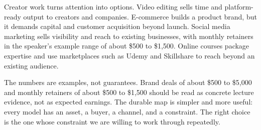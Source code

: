 Creator work turns attention into options. Video editing sells time and platform-ready output to creators and companies. E-commerce builds a product brand, but it demands capital and customer acquisition beyond launch. Social media marketing sells visibility and reach to existing businesses, with monthly retainers in the speaker's example range of about \$500 to \$1,500. Online courses package expertise and use marketplaces such as Udemy and Skillshare to reach beyond an existing audience.

The numbers are examples, not guarantees. Brand deals of about \$500 to \$5,000 and monthly retainers of about \$500 to \$1,500 should be read as concrete lecture evidence, not as expected earnings. The durable map is simpler and more useful: every model has an asset, a buyer, a channel, and a constraint. The right choice is the one whose constraint we are willing to work through repeatedly.